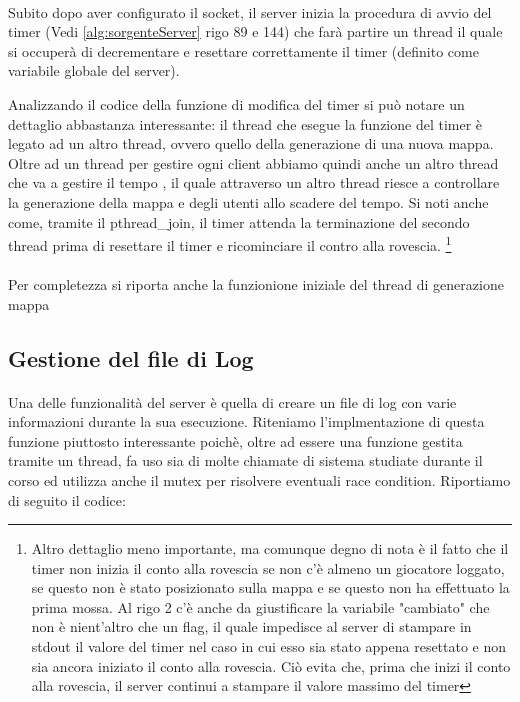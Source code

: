 \documentclass[a4paper]{article}
\begin{document}
\paragraph{}
Subito dopo aver configurato il socket, il server inizia la procedura di avvio del timer (Vedi \autoref{alg:sorgenteServer} rigo 89 e 144) che farà partire un thread il quale si occuperà
di decrementare e resettare correttamente il timer (definito come variabile globale del server).

Analizzando il codice della funzione di modifica del timer si può notare un dettaglio abbastanza interessante: 
il thread che esegue la funzione del timer è legato ad un altro thread, ovvero quello della generazione di una nuova mappa.
Oltre ad un thread per gestire ogni client abbiamo quindi anche un altro thread che va a gestire il tempo ,
il quale attraverso un altro thread riesce a controllare la generazione della mappa e degli utenti allo scadere del tempo.
Si noti anche come, tramite il pthread\_join, il timer attenda la terminazione del secondo thread prima di resettare il timer e ricominciare il contro alla rovescia.
\footnote{Altro dettaglio meno importante, ma comunque degno di nota è il fatto che il timer non inizia il conto alla rovescia
se non c'è almeno un giocatore loggato, se questo non è stato posizionato sulla mappa e se questo non ha effettuato la prima mossa.
Al rigo 2 c'è anche da giustificare la variabile "cambiato" che non è nient'altro che un flag, il quale impedisce al server di stampare in stdout il valore del timer nel caso in cui esso sia stato appena resettato e non sia ancora iniziato il conto alla rovescia. Ciò evita che, prima che inizi il conto alla rovescia, il server continui a stampare il valore massimo del timer }
\paragraph{}
Per completezza si riporta anche la funzionione iniziale del thread di generazione mappa

\pagebreak
\subsection{Gestione del file di Log}
\paragraph{}
Una delle funzionalità del server è quella di creare un file di log con varie informazioni durante la sua esecuzione.
Riteniamo l'implmentazione di questa funzione piuttosto interessante poichè, oltre ad essere una funzione gestita tramite un thread, fa uso sia di molte chiamate di sistema studiate durante il corso 
ed utilizza anche il mutex per risolvere eventuali race condition.
Riportiamo di seguito il codice:

\end{document}
